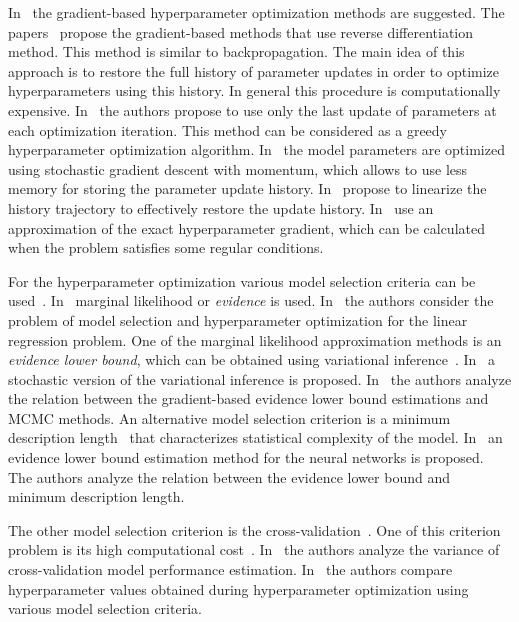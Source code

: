 \documentclass[smallextended]{svjour3}
\begin{document}
In~\cite{hyper,hyper2,hyper_mad,hyper_hoag,hyper_greed} the gradient-based hyperparameter optimization methods are suggested. The papers~\cite{hyper_mad,hyper} propose the gradient-based methods that use reverse differentiation method. This method is similar to backpropagation. The main idea of this approach is to restore the full history of parameter updates in order to optimize hyperparameters using this history. In general this procedure is computationally expensive. In~\cite{hyper_greed} the authors propose to use only the last update of parameters at each optimization iteration. This method can be considered as a greedy hyperparameter optimization algorithm. In~\cite{hyper}  the model parameters are optimized using stochastic gradient descent with momentum, which allows to use less memory for storing the parameter update history. In~\cite{hyper_mad} propose to linearize the history trajectory to effectively restore the update history. In~\cite{hyper_hoag} use an approximation of the exact hyperparameter gradient, which can be calculated when the problem satisfies some regular conditions.

For the hyperparameter optimization various model selection criteria can be used~\cite{MacKay,Bishop}. 
In~\cite{MacKay,Bishop,tokmakova,strijov_dsc}  marginal likelihood or \textit{evidence} is used. In~\cite{tokmakova,strijov_dsc} the authors consider the problem of model selection and hyperparameter optimization for the linear regression problem. One of  the marginal likelihood approximation methods is an \textit{evidence lower bound}, which can be obtained using variational inference~\cite{Bishop}. In~\cite{hoffman} a stochastic version of the variational inference is proposed. In~\cite{varmc} the authors analyze the relation between the gradient-based evidence lower bound estimations and MCMC methods. An alternative model selection criterion is a minimum description length~\cite{mdl} that characterizes statistical complexity of the model. In~\cite{nips} an evidence lower bound estimation method for the neural networks is proposed. The authors analyze the relation between the evidence lower bound and minimum description length. 

The other model selection criterion is the cross-validation~\cite{cv_ms,tokmakova}. One of this criterion problem  is its high computational cost~\cite{expensive,expensive2}. In~\cite{bias,bias2} the authors analyze the variance of cross-validation model performance estimation. In~\cite{tokmakova} the authors compare hyperparameter values obtained during hyperparameter optimization using various model selection criteria.
\end{document}
